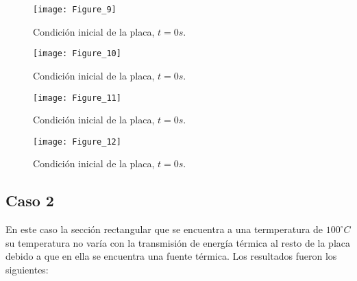 \documentclass{article}
\begin{document}
\begin{itemize}
\begin{figure}
\begin{center}
\texttt{[image: Figure\_9]}
\end{center}
\caption{Condici\'on inicial de la placa, $t = 0 s$.}
\end{figure}

\begin{figure}
\begin{center}
\texttt{[image: Figure\_10]}
\end{center}
\caption{Condici\'on inicial de la placa, $t = 0 s$.}
\end{figure}

\begin{figure}
\begin{center}
\texttt{[image: Figure\_11]}
\end{center}
\caption{Condici\'on inicial de la placa, $t = 0 s$.}
\end{figure}

\begin{figure}
\begin{center}
\texttt{[image: Figure\_12]}
\end{center}
\caption{Condici\'on inicial de la placa, $t = 0 s$.}
\end{figure}

\end{itemize}



\subsection{Caso 2} En este caso la secci\'on rectangular que se encuentra a una termperatura de $100^{\circ} C$ su temperatura no var\'ia con la transmisi\'on de energ\'ia t\'ermica al resto de la placa debido a que en ella se encuentra una fuente t\'ermica. Los resultados fueron los siguientes:
\end{document}
